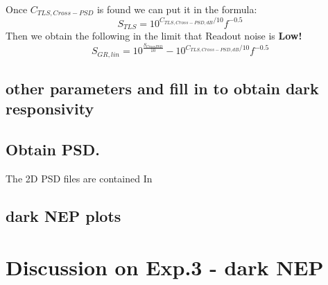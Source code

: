 Once $C_{TLS,Cross-PSD}$ is found we can put it in the formula:
$$S_{TLS} = 10^{C_{TLS,Cross-PSD,dB}/10}f^{-0.5}$$
Then we obtain the following in the limit that Readout noise is \textbf{Low!}
$$S_{GR,lin} = 10^{\frac{S_{CrossPSD}}{10}} - 10^{C_{TLS,Cross-PSD,dB}/10}f^{-0.5}$$





\subsection*{other parameters and fill in to obtain dark responsivity}

\subsection*{Obtain PSD.}

The 2D PSD files are contained In

\subsection*{dark NEP plots}


\section{Discussion on Exp.3 - dark NEP} 




